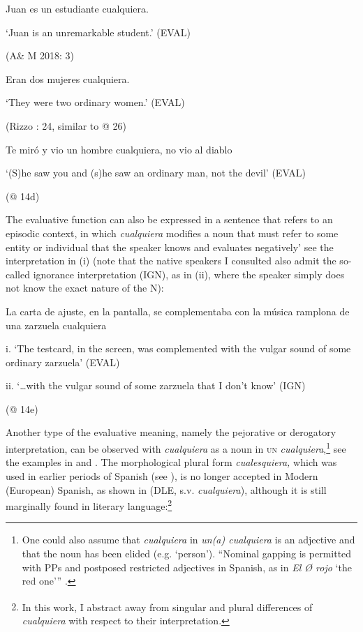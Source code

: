 \label{bkm:Ref533761081}  Juan es un estudiante cualquiera. 

‘Juan is an unremarkable student.’ (EVAL)

  (A\& M 2018: 3)

  Eran dos mujeres cualquiera. 

  ‘They were two ordinary women.’ (EVAL)

  (Rizzo \citealt{Salierno2013}: 24, similar to @ 26)

\label{bkm:Ref533953228}  Te miró y vio un hombre cualquiera, no vio al diablo 

  ‘(S)he saw you and (s)he saw an ordinary man, not the devil’ (EVAL)

  (@ 14d)

The evaluative function can also be expressed in a sentence that refers to an episodic context, in which \textit{cualquiera} modifies a noun that must refer to some entity or individual that the speaker knows and evaluates negatively’ see the interpretation in (i) (note that the native speakers I consulted also admit the so-called ignorance interpretation (IGN), as in (ii), where the speaker simply does not know the exact nature of the N):

\label{bkm:Ref54686931}  La carta de ajuste, en la pantalla, se complementaba con la música ramplona de una zarzuela cualquiera 

  i.   ‘The testcard, in the screen, was complemented with the vulgar sound of some ordinary zarzuela’   (EVAL)

  ii.  ‘…with the vulgar sound of some zarzuela that I don’t know’ (IGN)

  (@ 14e)

Another type of the evaluative meaning, namely the pejorative or derogatory interpretation, can be observed with \textit{cualquiera} as a noun in \textsc{un} \textit{cualquiera},\footnote{{One could also assume that} {\textit{cualquiera}} {in} {\textit{un(a) cualquiera}} {is an adjective and that the noun has been elided (e.g. ‘person’). “Nominal gapping is permitted with PPs and postposed restricted adjectives in Spanish, as in} {\textit{El Ø rojo}} {‘the red one’” \citep[34]{Bosque2001}.}} see the examples in  and . The morphological plural form \textit{cualesquiera,} which was used in earlier periods of Spanish (see ), is no longer accepted in Modern (European) Spanish, as shown in  (DLE, s.v. \textit{cualquiera}), although it is still marginally found in literary language:\footnote{{\textsuperscript{} }{In this work, I abstract away from singular and plural differences of} {\textit{cualquiera}} {with respect to their interpretation.} }

